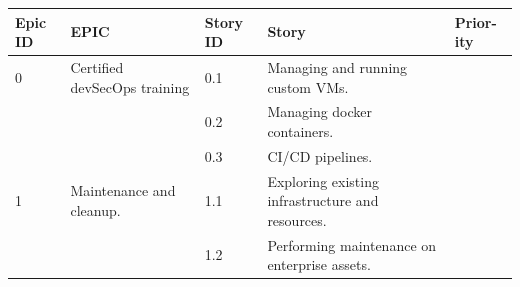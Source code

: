 \begin{longtable}[!ht]{|m{1cm}|m{3cm}|m{1cm}|m{7cm}|m{1.2cm}|}
\hline
 {\textbf{Epic ID}} & {\textbf{EPIC}} & {\textbf{Story ID}} & {\textbf{Story}} & {\textbf{Prior-ity}} \\
 \hline
0 & \raggedright Certified devSecOps training &	0.1 &	Managing and running custom VMs. & \\
\cline{3-5}
&   & 0.2 &	Managing docker containers.	& \\
\cline{3-5}
&   & 0.3 &	CI/CD pipelines. & \\
\hline
1 & Maintenance and cleanup. &	1.1	& Exploring existing infrastructure and resources. & \\
\cline{3-5}
&   &	1.2 & Performing maintenance on enterprise assets. & \\


\end{longtable}
